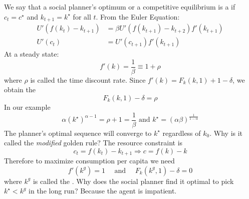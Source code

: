 \documentclass[10pt]{article}
\begin{document}
\begin{definition}
	We say that a social planner's optimum or a competitive equilibrium is a  if $c_t = c^\star$ and $k_{t+1} = k^\star$ for all $t$. From the Euler Equation:
	\begin{align*}
		U'(f(k_t) - k_{t+1}) &= \beta U'(f(k_{t+1}) - k_{t+2}) f'(k_{t+1}) \\
		U'(c_t) &= U'(c_{t+1}) f'(k_{t+1})
	\end{align*}
	At a steady state:
	\[
	f'(k) = \frac{1}{\beta} \equiv 1 + \rho
	\]
	where $\rho$ is called the time discount rate. Since $f'(k) = F_k(k,1) + 1 - \delta$, we obtain the  
	\[
	F_k(k,1) - \delta = \rho
	\]
	In our example
	\[
	\alpha (k^\star)^{\alpha - 1} = \rho + 1 = \frac{1}{\beta} \text{ and } k^\star = (\alpha \beta)^{\frac{1}{1 - \alpha}}
	\]
	The planner's optimal sequence will converge to $k^\star$ regardless of $k_0$. Why is it called the \emph{modified} golden rule? The resource constraint is
	\[
	c_t = f(k_t) - k_{t+1} \Longrightarrow c = f(k) - k
	\]
	Therefore to maximize consumption per capita we need
	\[
	f'(k^g) = 1 \quad \text{ and } \quad F_k(k^g,1) - \delta = 0
	\]
	where $k^g$ is called the . Why does the social planner find it optimal to pick $k^\star < k^g$ in the long run? Because the agent is impatient.
\end{definition}
\end{document}
